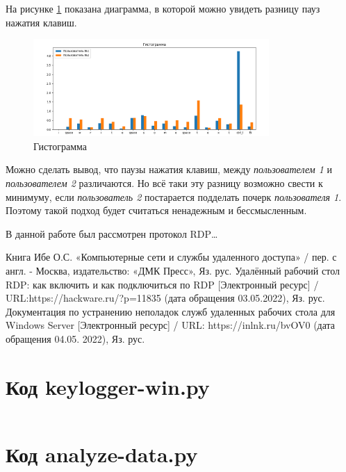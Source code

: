 \documentclass[bachelor, och, coursework]{SCWorks}
\begin{document}
  На рисунке \ref{hist} показана диаграмма, в которой можно увидеть разницу пауз нажатия клавиш.

  \begin{figure}[H]
    \centering
    \includegraphics[width=0.8\textwidth]{photo/hist.png}
    \caption{Гистограмма}
    \label{hist}
  \end{figure}

  Можно сделать вывод, что паузы нажатия клавиш, между \textit{пользователем 1} и \textit{пользователем 2} различаются. Но всё таки эту разницу
  возможно свести к минимуму, если \textit{пользователь 2} постарается подделать почерк \textit{пользователя 1}. Поэтому такой подход будет считаться
  ненадежным и бессмысленным.

   \conclusion

  В данной работе был рассмотрен протокол RDP\dots

  \begin{thebibliography}{15}
    Книга Ибе О.С. «Компьютерные сети и службы удаленного доступа» / пер. с англ. -
    Москва, издательство: «ДМК Пресс», Яз. рус.
    Удалённый рабочий стол RDP: как включить и как подключиться по RDP [Электронный ресурс] / URL:https://hackware.ru/?p=11835 (дата обращения 03.05.2022), Яз. рус.
    Документация по устранению неполадок служб удаленных рабочих стола для Windows Server [Электронный ресурс] / URL: https://inlnk.ru/bvOV0 (дата обращения 04.05. 2022), Яз. рус.

  \end{thebibliography}

  \appendix

    \section{Код keylogger-win.py}
    \inputminted[fontsize=\footnotesize]{text}{keylogger-win.py}


    \section{Код analyze-data.py}
    \inputminted[fontsize=\footnotesize]{text}{analyze-data.py}
\end{document}
